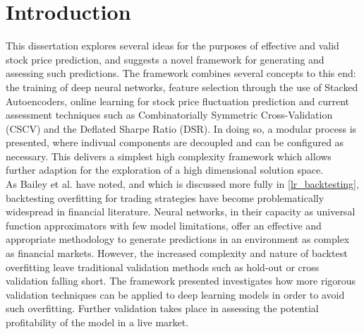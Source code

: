 \documentclass[a4paper,11pt,oneside]{article}
\theoremstyle{plain}
\theoremstyle{definition}
\begin{document}
	
	\section{Introduction}\label{Introduction}
	
	This dissertation explores several ideas for the purposes of effective and valid stock price prediction, and suggests a novel framework for generating and assessing such predictions. The framework combines several concepts to this end: the training of deep neural networks, feature selection through the use of Stacked Autoencoders, online learning for stock price fluctuation prediction and current assessment techniques such as Combinatorially Symmetric Cross-Validation (CSCV) and the Deflated Sharpe Ratio (DSR). In doing so, a modular process is presented, where indivual components are decoupled and can be configured as necessary. This delivers a simplest high complexity framework which allows further adaption for the exploration of a high dimensional solution space. 
	~\\\newline
	As Bailey et al. have noted, and which is discussed more fully in \ref{lr_backtesting}, backtesting overfitting for trading strategies have become problematically widespread in financial literature. Neural networks, in their capacity as universal function approximators with few model limitations, offer an effective and appropriate methodology to generate predictions in an environment as complex as financial markets. However, the increased complexity and nature of backtest overfitting leave traditional validation methods such as hold-out or cross validation falling short. The framework presented investigates how more rigorous validation techniques can be applied to deep learning models in order to avoid such overfitting. Further validation takes place in assessing the potential profitability of the model in a live market.
	~\\\newline
\end{document}
